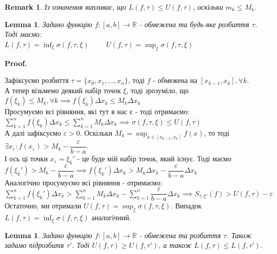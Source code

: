 \documentclass[a4paper, 10pt]{article}
\makeatletter
\def\huge{\displaystyle}
\def\qed{$\blacksquare$}
\theoremstyle{theoremdd}
\theoremstyle{theoremdd}
\theoremstyle{theoremdd}
\theoremstyle{theoremdd}
\theoremstyle{theoremdd}
\theoremstyle{theoremdd}
\newtheorem{remark}[theorem]{Remark}
\theoremstyle{theoremdd}
\newtheorem{lemma}[theorem]{Lemma}
\theoremstyle{theoremdd}
\renewenvironment{proof}[1][Proof.\\]{\par
\pushQED{\hfill \qed}%
\normalfont \topsep6\p@\@plus6\p@\relax
\trivlist
\item\relax
{\bfseries
#1\@addpunct{.}}\hspace\labelsep\ignorespaces
}{%
\popQED\endtrivlist\@endpefalse
}
\makeatother
\begin{document}
\begin{remark}
Із означення випливає, що $L(f,\tau) \leq U(f,\tau)$, оскільки $m_k \leq M_k$.
\end{remark}

\begin{lemma}
Задано функцію $f: [a,b] \to \mathbb{R}$ - обмежена та будь-яке розбиття $\tau$. Тоді маємо:\\
$L(f,\tau) = \huge\inf_{\xi} \sigma(f,\tau,\xi) \hspace{1cm} U(f,\tau) = \huge\sup_{\xi} \sigma(f,\tau,\xi)$
\end{lemma}

\begin{proof}
Зафіксуємо розбиття $\tau = \{x_0,x_1,\dots,x_n\}$, тоді $f$ - обмежена на $[x_{k-1},x_k], \forall k$.\\
А тепер візьмемо деякий набір точок $\xi$, тоді зрозуміло, що $f(\xi_k) \leq M_k, \forall k \implies f(\xi_k) \Delta x_k \leq M_k \Delta x_k$\\
Просумуємо всі рівняння, які тут в нас є - тоді отримаємо:\\
$\huge\sum_{k=1}^n f(\xi_k) \Delta x_k \leq \huge\sum_{k=1}^n M_k \Delta x_k \implies \sigma(f,\tau,\xi) \leq U(f, \tau)$
\bigskip \\
А далі зафіксуємо $\varepsilon > 0$. Оскільки $M_k = \huge\sup_{x \in [x_{k-1},x_k]} f(x)$, то тоді $\exists x_\varepsilon: f(x_\varepsilon) > M_k - \dfrac{\varepsilon}{b-a}$.\\
І ось ці точки $x_\varepsilon = \xi_k'$ - це буде мій набір точок, який існує. Тоді маємо\\
$f(\xi_k') > M_k - \dfrac{\varepsilon}{b-a} \implies f(\xi_k') \Delta x_k > M_k \Delta x_k - \dfrac{\varepsilon}{b-a} \Delta x_k$\\
Аналогічно просумуємо всі рівняння - отримаємо:\\
$\huge\sum_{k=1}^n f(\xi_k') \Delta x_k > \sum_{k=1}^n M_k \Delta x_k - \sum_{k=1}^n \dfrac{\varepsilon}{b-a} \Delta x_k \implies S_{\tau, \xi'}(f) > U(f,\tau) - \varepsilon$\\
Остаточно, ми отримали $U(f, \tau) = \huge\sup_\xi \sigma(f,\tau,\xi)$. Випадок $L(f,\tau) = \huge\inf_\xi \sigma(f,\tau,\xi)$ аналогічний.
\end{proof}

\begin{lemma}
Задано функцію $f: [a,b] \to \mathbb{R}$ - обмежена та розбиття $\tau$. Також задамо підрозбитя $\tau'$. Тоді $U(f,\tau) \geq U(f,\tau')$, а також  $L(f,\tau) \leq L(f,\tau')$.
\end{lemma}
\end{document}
